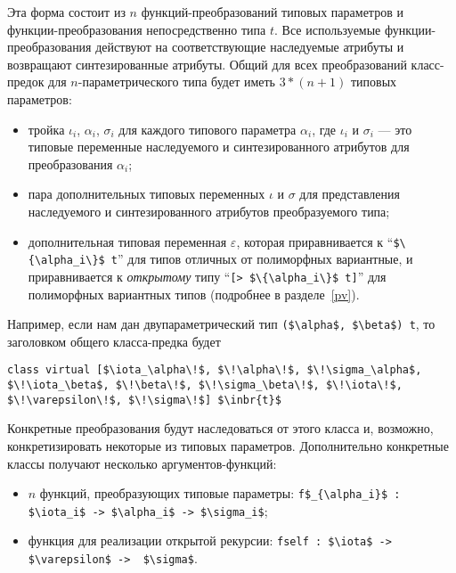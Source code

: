 \noindent Эта форма состоит из $n$ функций-преобразований типовых параметров и функции-преобразования непосредственно типа  $t$. Все используемые функции-преобразования действуют на соответствующие наследуемые атрибуты и возвращают синтезированные атрибуты.
Общий для всех преобразований класс-предок для $n$-параметрического типа будет иметь $3*(n+1)$ типовых параметров:

\begin{itemize}
\item тройка $\iota_i$, $\alpha_i$, $\sigma_i$ для каждого типового параметра $\alpha_i$, где $\iota_i$ и $\sigma_i$ --- это типовые переменные наследуемого и синтезированного атрибутов для преобразования  $\alpha_i$;
\item пара дополнительных типовых переменных $\iota$ и $\sigma$ для представления наследуемого и синтезированного атрибутов преобразуемого типа;
\item дополнительная типовая переменная $\varepsilon$, которая приравнивается к ``\lstinline|$\{\alpha_i\}$ t|'' для типов отличных от полиморфных вариантные, и приравнивается к \emph{открытому} типу ``\lstinline|[> $\{\alpha_i\}$ t]|'' для полиморфных вариантных типов (подробнее в разделе~\ref{pv}).
\end{itemize}

\noindent Например, если нам дан двупараметрический тип \lstinline{($\alpha$, $\beta$) t}, то заголовком общего класса-предка будет 

\begin{lstlisting}
class virtual [$\iota_\alpha\!$, $\!\alpha\!$, $\!\sigma_\alpha$, $\!\iota_\beta$, $\!\beta\!$, $\!\sigma_\beta\!$, $\!\iota\!$, $\!\varepsilon\!$, $\!\sigma\!$] $\inbr{t}$
\end{lstlisting}

Конкретные преобразования будут наследоваться от этого класса и, возможно, конкретизировать некоторые из типовых параметров.
Дополнительно конкретные классы получают несколько аргументов-функций:

\begin{itemize}
\item $n$ функций, преобразующих типовые параметры: \lstinline|f$_{\alpha_i}$ : $\iota_i$ -> $\alpha_i$ -> $\sigma_i$|;
\item функция для реализации открытой рекурсии: \lstinline|fself : $\iota$ -> $\varepsilon$ ->  $\sigma$|.
\end{itemize}

